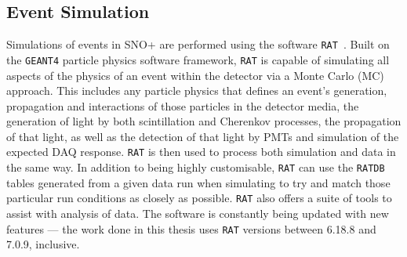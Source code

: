 \subsection{Event Simulation}
Simulations of events in SNO+ are performed using the software \texttt{RAT}~\cite{albaneseSNOExperiment2021}. %
Built on the \texttt{GEANT4} particle physics software framework, \texttt{RAT} is capable of simulating all aspects of the physics of an event within the detector via a Monte Carlo (MC) approach. This includes any particle physics that defines an event's generation, propagation and interactions of those particles in the detector media, the generation of light by both scintillation and Cherenkov processes, the propagation of that light, as well as the detection of that light by PMTs and simulation of the expected DAQ response. \texttt{RAT} is then used to process both simulation and data in the same way. In addition to being highly customisable, \texttt{RAT} can use the \texttt{RATDB} tables generated from a given data run when simulating to try and match those particular run conditions as closely as possible. \texttt{RAT} also offers a suite of tools to assist with analysis of data. The software is constantly being updated with new features --- the work done in this thesis uses \texttt{RAT} versions between 6.18.8 and 7.0.9, inclusive.

